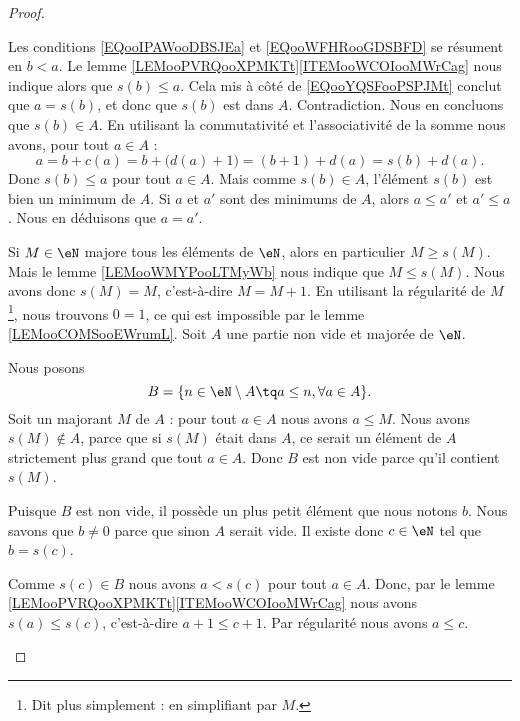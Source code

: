 \begin{proof}
\begin{subproof}
\begin{subproof}
			Les conditions \eqref{EQooIPAWooDBSJEa} et \eqref{EQooWFHRooGDSBFD} se résument en \( b<a\). Le lemme \ref{LEMooPVRQooXPMKTt}\ref{ITEMooWCOIooMWrCag} nous indique alors que \( s(b)\leq a\). Cela mis à côté de \eqref{EQooYQSFooPSPJMt} conclut que \( a=s(b)\), et donc que \( s(b)\) est dans \( A\). Contradiction. Nous en concluons que \( s(b)\in A\).
			En utilisant la commutativité et l'associativité de la somme nous avons, pour tout \( a\in A\) :
			\begin{equation}
				a=b+c(a)=b+\big( d(a)+1 \big)=(b+1)+d(a)=s(b)+d(a).
			\end{equation}
			Donc \( s(b)\leq a\) pour tout \( a\in A\). Mais comme \( s(b)\in A\), l'élément \( s(b)\) est bien un minimum de \( A\).
			\spitem[Unicité]
			Si \( a\) et \( a'\) sont des minimums de \( A\), alors \( a\leq a'\) et \( a'\leq a\). Nous en déduisons que \( a=a'\).
		\end{subproof}
		Si \( M\in \eN\) majore tous les éléments de \( \eN\), alors en particulier \( M\geq s(M)\). Mais le lemme \ref{LEMooWMYPooLTMyWb} nous indique que \( M\leq s(M)\). Nous avons donc \( s(M)=M\), c'est-à-dire \( M=M+1\). En utilisant la régularité de \( M\)\footnote{Dit plus simplement : en simplifiant par \( M\).}, nous trouvons \( 0=1\), ce qui est impossible par le lemme \ref{LEMooCOMSooEWrumL}.
		Soit \( A\) une partie non vide et majorée de \( \eN\).
		\begin{subproof}
			\spitem[L'ensemble \( B\)]
			Nous posons
			\begin{equation}
				B=\{ n\in \eN\setminus A\tq a\leq n, \forall a \in A \}.
			\end{equation}
			Soit un majorant \( M\) de \( A\) : pour tout \( a\in A\) nous avons \( a\leq M\). Nous avons \( s(M)\notin A\), parce que si \( s(M)\) était dans \( A\), ce serait un élément de \( A\) strictement plus grand que tout \( a\in A\). Donc \( B\) est non vide parce qu'il contient \( s(M)\).
		\end{subproof}
		\spitem[Minimum]
		Puisque \( B\) est non vide, il possède un plus petit élément que nous notons \( b\). Nous savons que \( b\neq 0\) parce que sinon \( A\) serait vide. Il existe donc \( c\in \eN\) tel que \( b=s(c)\).

		Comme \( s(c)\in B\) nous avons \( a< s(c)\) pour tout \( a\in A\). Donc, par le lemme \ref{LEMooPVRQooXPMKTt}\ref{ITEMooWCOIooMWrCag} nous avons \( s(a)\leq s(c)\), c'est-à-dire \( a+1\leq c+1\). Par régularité nous avons \( a\leq c\).


\end{subproof}
\end{proof}

